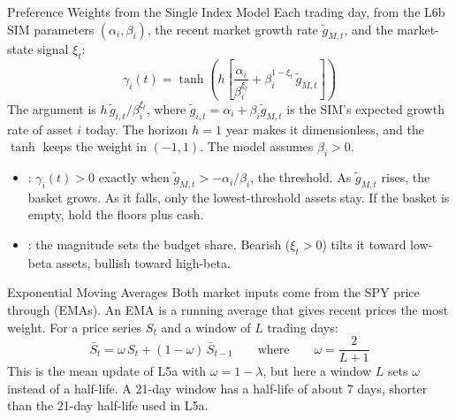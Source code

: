 \documentclass[aspectratio=169,11pt]{beamer}
\begin{document}
\begin{frame}{Preference Weights from the Single Index Model}
  Each trading day, from the L6b SIM parameters $(\alpha_i,\beta_i)$, the recent
  market growth rate $\tilde g_{M,t}$, and the market-state signal $\xi_t$:
  \[
    \boxed{\gamma_i(t)=\tanh\!\left(h\left[\frac{\alpha_i}{\beta_i^{\xi_t}}+\beta_i^{1-\xi_t}\,\tilde g_{M,t}\right]\right)}
  \]
  The argument is $h\,\tilde g_{i,t}/\beta_i^{\xi_t}$, where $\tilde g_{i,t}=\alpha_i+\beta_i\tilde g_{M,t}$
  is the SIM's expected growth rate of asset $i$ today. The horizon $h=1$ year makes it
  dimensionless, and the $\tanh$ keeps the weight in $(-1,1)$. The model assumes $\beta_i>0$.
  \begin{itemize}\setlength{\itemsep}{0.2em}
    \item {}: $\gamma_i(t)>0$ exactly when
      $\tilde g_{M,t}>-\alpha_i/\beta_i$, the threshold. As $\tilde g_{M,t}$ rises, the basket
      grows. As it falls, only the lowest-threshold assets stay. If the basket
      is empty, hold the floors plus cash.
    \item {}: the magnitude sets the budget share.
      Bearish ($\xi_t>0$) tilts it toward low-beta assets, bullish toward
      high-beta.
  \end{itemize}
\end{frame}

\begin{frame}{Exponential Moving Averages}
  Both market inputs come from the SPY price through  (EMAs). An EMA is a running average that gives recent prices the most
  weight. For a price series $S_t$ and a window of $L$ trading days:
  \[
    \boxed{\bar S_t=\omega\,S_t+(1-\omega)\,\bar S_{t-1}\qquad\text{where}\qquad\omega=\frac{2}{L+1}}
  \]
  This is the mean update of L5a with $\omega=1-\lambda$, but here a window $L$
  sets $\omega$ instead of a half-life. A 21-day window has a half-life of about
  7 days, shorter than the 21-day half-life used in L5a.
\end{frame}
\end{document}

